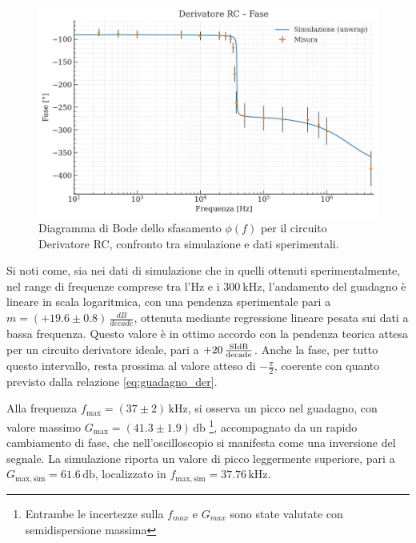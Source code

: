 \documentclass[a4paper,12pt]{article}
\begin{document}
\begin{figure}[H]
  \centering
  \includegraphics[width=.8\textwidth]{Derivatore_fase.png}
  \caption{Diagramma di Bode dello sfasamento $\phi(f)$ per il circuito Derivatore RC, confronto tra simulazione e dati sperimentali.}
\end{figure}

Si noti come, sia nei dati di simulazione che in quelli ottenuti sperimentalmente, nel range di frequenze comprese tra l’Hz e i \(\SI{300}{\kilo\hertz}\), l’andamento del guadagno è lineare in scala logaritmica, con una pendenza sperimentale pari a \(m = (+19.6 \pm 0.8)\,\frac{dB}{decade}\), ottenuta mediante regressione lineare pesata sui dati a bassa frequenza. Questo valore è in ottimo accordo con la pendenza teorica attesa per un circuito derivatore ideale, pari a \(+20\,\si{\frac{SI{\decibel}}{decade}}\). Anche la fase, per tutto questo intervallo, resta prossima al valore atteso di \(-\frac{\pi}{2}\), coerente con quanto previsto dalla relazione \ref{eq:guadagno_der}.

Alla frequenza \(f_{\mathrm{max}} = (37 \pm 2)\,\si{\kilo\hertz}\), si osserva un picco nel guadagno, con valore massimo \(G_{\mathrm{max}} = (41.3 \pm 1.9)\,\si{\decibel}\) \footnote{Entrambe le incertezze sulla \(f_{max}\) e  \(G_{max}\) sono state valutate con semidispersione massima}, accompagnato da un rapido cambiamento di fase, che nell’oscilloscopio si manifesta come una inversione del segnale. La simulazione riporta un valore di picco leggermente superiore, pari a \(G_{\mathrm{max,sim}} = 61.6\,\si{\decibel}\), localizzato in \(f_{\mathrm{max,sim}} = 37.76\,\si{\kilo\hertz}\).
\end{document}
